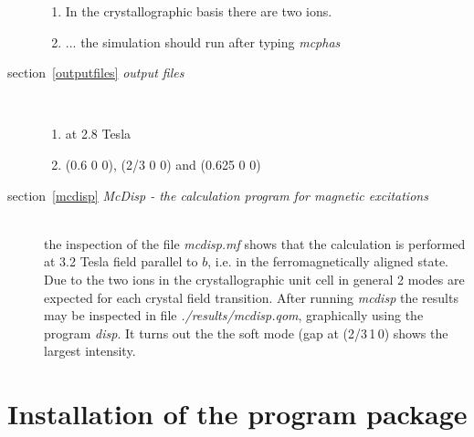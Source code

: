 \documentclass[twoside]{article}
\newcommand{\prg}{\sl}
\begin{document}
\begin{description}
 \begin{enumerate}
 \item In the crystallographic basis there are two ions.
 \item ... the simulation should run after typing {\prg mcphas}
 \end{enumerate}
\item[section~\ref{outputfiles} {\em output files}] \ 
 \begin{enumerate}
 \item at 2.8 Tesla
 \item (0.6 0 0), (2/3 0 0) and (0.625 0 0)
 \end{enumerate}
\item[section~\ref{mcdisp} {\em {\prg McDisp} - the calculation program for magnetic excitations}] \ \\
 the inspection of the file {\prg mcdisp.mf\index{mcdisp.mf}} shows that the calculation is performed at 3.2 Tesla field
 parallel to $b$, i.e. in the ferromagnetically aligned state. Due to the two ions in the crystallographic
 unit cell in general 2 modes are expected for each crystal field transition. After running {\prg mcdisp}
 the results may be inspected in file {\prg ./results/mcdisp.qom}, graphically using the program {\prg disp}.
 It turns out the the soft mode (gap at (2/3\,1\,0) shows the largest intensity.
\end{description}

\clearpage
\section{Installation of the program package}




\newpage


\newpage
\printindex
\end{document}
